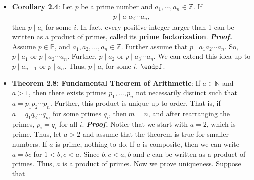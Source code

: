 \documentclass{report}
\begin{document}
\begin{itemize}
            \begin{align*}
                p \mid pk + abc, \quad k,c \in \mathbb{Z}
            .\end{align*}
            If we let $k = ub$, $c = v$, then
            \begin{align*}
                p \mid p(ub) + abv = b
            .\end{align*}
            So, $p \mid b$. Now, consider the case in which $p$ is composite. In that case, let $p = cd$. Since $p > 1$, 
            \begin{align*}
                1 < c, d < p
            .\end{align*}
            So, $p \nmid c$ and $p\nmid d$. $\endpf$
        \item \textbf{Corollary 2.4}: Let $p$ be a prime number and $a_{1}, \cdots, a_{n} \in \mathbb{Z}$. If 
            \begin{align*}
                p \mid a_{1}a_{2}\cdots a_{n}
            ,\end{align*}
            then $p \mid a_{i}$ for some $i$. In fact, every positive integer larger than 1 can be written as a product of primes, called its \textbf{prime factorization}.
            \bigbreak \noindent 
            \textbf{\textit{Proof.}} Assume $p \in \mathbb{P}$, and $a_{1}, a_{2}, \ldots, a_{n} \in \mathbb{Z}$. Further assume that $p \mid a_{1} a_{2} \cdots a_{n}$.
            \bigbreak \noindent 
            So, $p \mid a_{1}$ or $p \mid a_{2}\cdots a_{n}$. Further, $p \mid a_{2}$ or $p \mid a_{3} \cdots a_{n} $. We can extend this idea up to $p \mid a_{n-1}$ or $p \mid a_{n}$. Thus, $p \mid a_{i}$ for some $i$. $\endpf$.
        \item \textbf{Theorem 2.8: Fundamental Theorem of Arithmetic}: If $a \in \mathbb{N}$ and $a > 1$, then there exists primes $p_{1}, \ldots, p_{n}$ not necessarily distinct such that $a = p_{1}p_{2} \cdots p_{n}$. Further, this product is unique up to order. That is, if $a = q_{1}q_{2} \cdots q_{m} $ for some primes $q_{i} $, then $m = n$, and after rearranging the primes, $p_{i} = q_{i}$ for all $i$.
            \bigbreak \noindent
            \textbf{\textit{Proof.}} Notice that we start with $a=2$, which is prime. Thus, let $a > 2$ and assume that the theorem is true for smaller numbers. If $a$ is prime, nothing to do. If $a$ is composite, then we can write $a = bc$ for $1 < b,c < a$. Since $b,c < a$, $b$ and $c$ can be written as a product of primes. Thus, $a$ is a product of primes.
            \bigbreak \noindent 
            Now we prove uniqueness. Suppose that 

\end{itemize}
\end{document}
